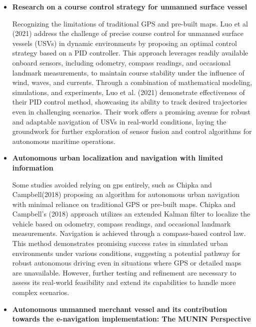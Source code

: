 \begin{itemize}
\item {\bf Research on a course control strategy for unmanned surface vessel \cite{Luo_2021}} 

Recognizing the limitations of traditional GPS and pre-built maps. Luo et al (2021) address the challenge of precise 
course control for unmanned surface vessels (USVs) in dynamic environments by proposing an optimal control strategy 
based on a PID controller. This approach leverages readily available onboard sensors, including odometry, compass 
readings, and occasional landmark measurements, to maintain course stability under the influence of wind, waves, and 
currents. Through a combination of mathematical modeling, simulations, and experiments, Luo et al. (2021) demonstrate 
effectiveness of their PID control method, showcasing its ability to track desired trajectories even in challenging 
scenarios. Their work offers a promising avenue for robust and adaptable navigation of USVs in real-world conditions, 
laying the groundwork for further exploration of sensor fusion and control algorithms for autonomous maritime operations.

\item {\bf Autonomous urban localization and navigation with limited information \cite{DBLP:journals/corr/abs-1810-04243}} 

Some studies avoided relying on gps entirely, such as Chipka and Campbell(2018) proposing an algorithm for autonomous 
urban navigation with minimal reliance on traditional GPS or pre-built maps. Chipka and Campbell’s (2018) approach 
utilizes an extended Kalman filter to localize the vehicle based on odometry, compass readings, and occasional landmark 
measurements. Navigation is achieved through a compass-based control law. This method demonstrates promising success 
rates in simulated urban environments under various conditions, suggesting a potential pathway for robust autonomous 
driving even in situations where GPS or detailed maps are unavailable. However, further testing and refinement are 
necessary to assess its real-world feasibility and extend its capabilities to handle more complex scenarios.


\item {\bf Autonomous unmanned merchant vessel and its contribution towards the e-navigation implementation: The MUNIN Perspective \cite{BURMEISTER20141}} 


\end{itemize}
